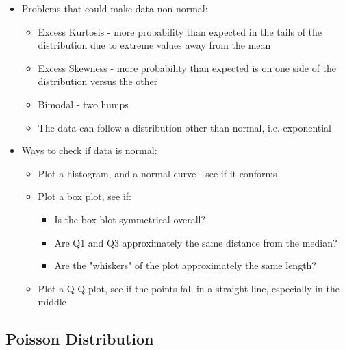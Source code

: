 \documentclass{article}
\begin{document}
\begin{itemize}
    \item Problems that could make data non-normal:
    \begin{itemize}
        \item Excess Kurtosis - more probability than expected in the tails of the distribution due to extreme values away from the mean
        \item Excess Skewness - more probability than expected is on one side of the distribution versus the other
        \item Bimodal - two humps
        \item The data can follow a distribution other than normal, i.e. exponential
    \end{itemize}
    \item Ways to check if data is normal:
    \begin{itemize}
        \item Plot a histogram, and a normal curve - see if it conforms
        \item Plot a box plot, see if:
        \begin{itemize}
            \item Is the box blot symmetrical overall?
            \item Are Q1 and Q3 approximately the same distance from the median?
            \item Are the "whiskers" of the plot approximately the same length?
        \end{itemize}
        \item Plot a Q-Q plot, see if the points fall in a straight line, especially in the middle
    \end{itemize}
\end{itemize}

\subsection{Poisson Distribution}
\end{document}
